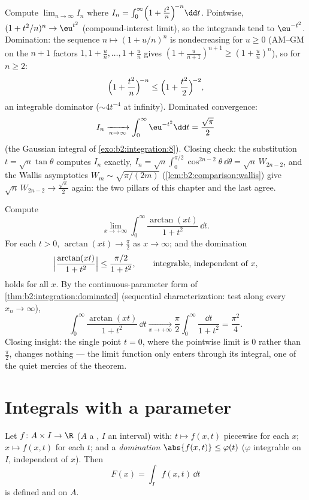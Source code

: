 \begin{example}\label{ex:b2:integration:wallislimit}
Compute $\displaystyle\lim_{n\to\infty} I_n$ where $I_n =
\int_0^\infty \Bigl(1 + \frac{t^2}{n}\Bigr)^{\!-n}\dd t$.
Pointwise, $(1 + t^2/n)^n \to \eu^{t^2}$ (compound-interest
limit), so the integrands tend to $\eu^{-t^2}$. Domination: the
sequence $n \mapsto (1 + u/n)^n$ is nondecreasing for $u \geq 0$
(AM--GM on the $n + 1$ factors $1, 1 + \frac un, \dots, 1 +
\frac un$ gives $(1 + \frac u{n+1})^{n+1} \geq (1 + \frac
un)^n$), so for $n \geq 2$:
\[
\Bigl(1 + \frac{t^2}{n}\Bigr)^{\!-n}
\leq \Bigl(1 + \frac{t^2}{2}\Bigr)^{\!-2},
\]
an integrable dominator ($\sim 4t^{-4}$ at infinity). Dominated
convergence:
\[
I_n \xrightarrow[n\to\infty]{} \int_0^\infty \eu^{-t^2}\dd t
= \frac{\sqrt\pi}{2}
\]
(the Gaussian integral of \cref{exo:b2:integration:8}). Closing
check: the substitution $t = \sqrt n\tan\theta$ computes $I_n$
exactly, $I_n = \sqrt n\int_0^{\pi/2}\cos^{2n-2}\theta\,\dd\theta
= \sqrt n\,W_{2n-2}$, and the Wallis asymptotics $W_m \sim
\sqrt{\pi/(2m)}$ (\cref{lem:b2:comparison:wallis}) give $\sqrt
n\,W_{2n-2} \to \frac{\sqrt\pi}2$ again: the two pillars of this
chapter and the last agree.
\end{example}

\begin{example}
\label{ex:b2:integration:arctanlimit}
Compute
\[
\lim_{x\to+\infty}\int_0^\infty
\frac{\arctan(xt)}{1+t^2}\,\dd t .
\]
For each $t > 0$,
$\arctan(xt) \to \frac\pi2$ as $x \to \infty$; and the
domination
\[
\Bigl|\frac{\arctan(xt)}{1+t^2}\Bigr|
\leq \frac{\pi/2}{1+t^2},
\qquad\text{integrable, independent of } x,
\]
holds for all $x$. By the continuous-parameter form of
\cref{thm:b2:integration:dominated} (sequential
characterization: test along every $x_n \to \infty$),
\[
\int_0^\infty\frac{\arctan(xt)}{1+t^2}\,\dd t
\xrightarrow[x\to+\infty]{}
\frac\pi2\int_0^\infty\frac{\dd t}{1+t^2}
= \frac{\pi^2}{4} .
\]
Closing insight: the single point $t = 0$, where the pointwise
limit is $0$ rather than $\frac\pi2$, changes nothing --- the
limit function only enters through its integral, one of the
quiet mercies of the theorem.
\end{example}

\section{Integrals with a parameter}

\begin{theorem}\label{thm:b2:integration:continuity}
Let $f \colon A \times I \to \R$ ($A$ a , $I$ an
interval) with: $t \mapsto f(x, t)$ piecewise  for each
$x$; $x \mapsto f(x, t)$  for each $t$; and a
\emph{domination} $\abs{f(x,t)} \leq \varphi(t)$ ($\varphi$
integrable on $I$, independent of $x$). Then
\[
F(x) = \int_I f(x, t)\,\dd t
\]
is defined and  on $A$.
\end{theorem}


